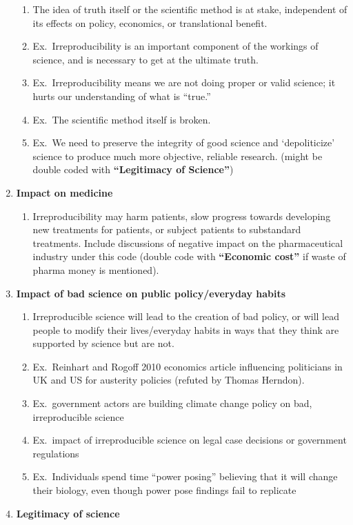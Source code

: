 \documentclass[
]{scrartcl}
\providecommand{\tightlist}{%
  \setlength{\itemsep}{0pt}\setlength{\parskip}{0pt}}
\begin{document}
\begin{enumerate}
\begin{enumerate}
  \item
    The idea of truth itself or the scientific method is at stake,
    independent of its effects on policy, economics, or translational
    benefit.
  \item
    Ex.~Irreproducibility is an important component of the workings of
    science, and is necessary to get at the ultimate truth.
  \item
    Ex.~Irreproducibility means we are not doing proper or valid
    science; it hurts our understanding of what is ``true.''
  \item
    Ex.~The scientific method itself is broken.
  \item
    Ex.~We need to preserve the integrity of good science and
    `depoliticize' science to produce much more objective, reliable
    research. (might be double coded with \textbf{``Legitimacy of
    Science''})
  \end{enumerate}
\item
  \textbf{Impact on medicine}

  \begin{enumerate}

  \tightlist
  \item
    Irreproducibility may harm patients, slow progress towards
    developing new treatments for patients, or subject patients to
    substandard treatments. Include discussions of negative impact on
    the pharmaceutical industry under this code (double code with
    \textbf{``Economic cost''} if waste of pharma money is mentioned).
  \end{enumerate}
\item
  \textbf{Impact of bad science on public policy/everyday habits}

  \begin{enumerate}

  \item
    Irreproducible science will lead to the creation of bad policy, or
    will lead people to modify their lives/everyday habits in ways that
    they think are supported by science but are not.
  \item
    Ex.~Reinhart and Rogoff 2010 economics article influencing
    politicians in UK and US for austerity policies (refuted by Thomas
    Herndon).
  \item
    Ex.~government actors are building climate change policy on bad,
    irreproducible science
  \item
    Ex.~impact of irreproducible science on legal case decisions or
    government regulations
  \item
    Ex.~Individuals spend time ``power posing'' believing that it will
    change their biology, even though power pose findings fail to
    replicate
  \end{enumerate}
\item
  \textbf{Legitimacy of science}


\end{enumerate}
\end{document}
